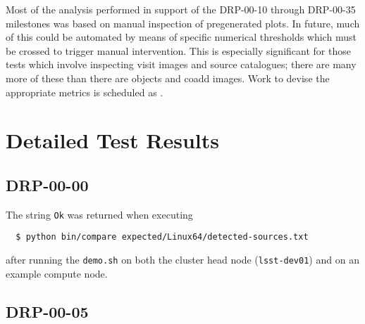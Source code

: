 \documentclass[DM,lsstdraft,STR,toc]{lsstdoc}
\begin{document}
Most of the analysis performed in support of the DRP-00-10 through DRP-00-35 milestones was based on manual inspection of pregenerated plots.
In future, much of this could be automated by means of specific numerical thresholds which must be crossed to trigger manual intervention.
This is especially significant for those tests which involve inspecting visit images and source catalogues; there are many more of these than there are objects and coadd images.
Work to devise the appropriate metrics is scheduled as .

\newpage

\section{Detailed Test Results}
\label{sect:detailed}

\subsection{DRP-00-00}
\label{sect:detail-drp-00-00}

The string \texttt{Ok} was returned when executing

\begin{verbatim}
  $ python bin/compare expected/Linux64/detected-sources.txt
\end{verbatim}

after running the \texttt{demo.sh} on both the cluster head node (\texttt{lsst-dev01}) and on an example compute node.

\subsection{DRP-00-05}
\label{sect:detail-drp-00-05}
\end{document}
